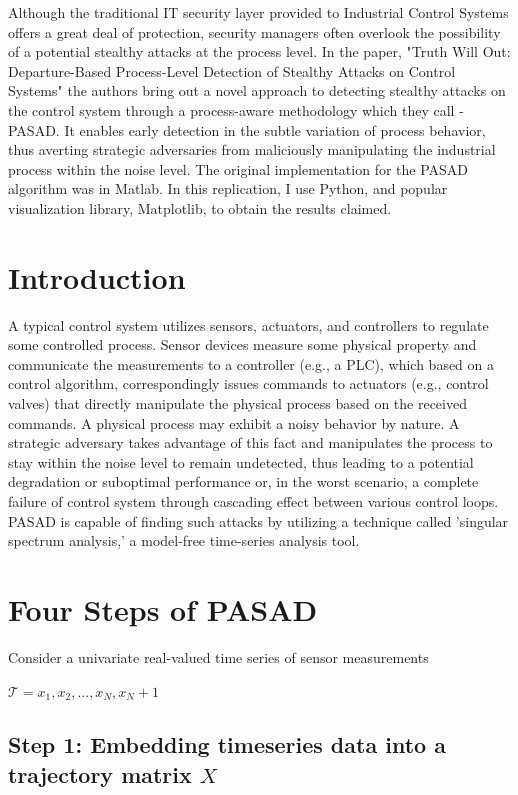 Although the traditional IT security layer provided to Industrial Control Systems offers a great deal of protection, security managers often overlook the possibility of a potential stealthy attacks at the process level. In the paper\supercite{Pasad:2018}, "Truth Will Out: Departure-Based Process-Level Detection of Stealthy Attacks on Control Systems" the authors bring out a novel approach to detecting stealthy attacks on the control system through a process-aware methodology which they call - PASAD. It enables early detection in the subtle variation of process behavior, thus averting strategic adversaries from maliciously manipulating the industrial process within the noise level. The original implementation for the PASAD algorithm was in Matlab. In this replication, I use Python, and popular visualization library, Matplotlib, to obtain the results claimed.

\section*{Introduction}

A typical control system utilizes sensors, actuators, and controllers to regulate some controlled process. Sensor devices measure some physical property and communicate the measurements to a controller (e.g., a PLC), which based on a control algorithm, correspondingly issues commands to actuators
(e.g., control valves) that directly manipulate the physical process based on the received commands. A physical process may exhibit a noisy behavior by nature. A strategic adversary takes advantage of this fact and manipulates the process to stay within the noise level to remain undetected, thus leading to a potential degradation or suboptimal performance or, in the worst scenario, a complete failure of control system through cascading effect between various control loops. PASAD is capable of finding such attacks by utilizing a technique called 'singular spectrum analysis,' a model-free time-series analysis tool.

\section*{Four Steps of PASAD}
Consider a univariate real-valued time series of sensor measurements

\begin{center}
$\mathcal{T}=x_1, x_2,...,x_N, x_N+1$
\end{center}

\subsection*{Step 1: Embedding timeseries data into a trajectory matrix $X$}

